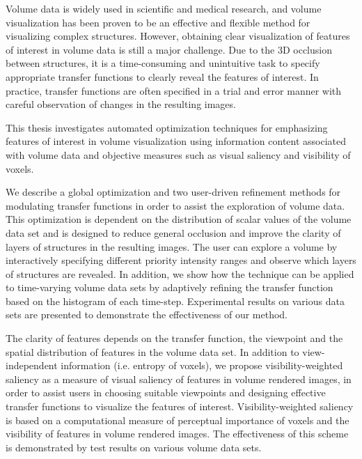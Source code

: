 \documentclass[a4paper, 12pt, oneside]{report}         %
\begin{document}
\begin{thesisabstract}
Volume data is widely used in scientific and medical research, and volume visualization has been proven to be an effective and flexible method for visualizing complex structures.
However, obtaining clear visualization of features of interest in volume data is still a major challenge.
Due to the 3D occlusion between structures, it is a time-consuming and unintuitive task to specify appropriate transfer functions to clearly reveal the features of interest.
In practice, transfer functions are often specified in a trial and error manner with careful observation of changes in the resulting images.

This thesis investigates automated optimization techniques for emphasizing features of interest in volume visualization using information content associated with volume data and objective measures such as visual saliency and visibility of voxels.

We describe a global optimization and two user-driven refinement methods for modulating transfer functions in order to assist the exploration of volume data.
This optimization is dependent on the distribution of scalar values of the volume data set and is designed to reduce general occlusion and improve the clarity of layers of structures in the resulting images.
The user can explore a volume by interactively specifying different priority intensity ranges and observe which layers of structures are revealed. In addition, we show how the technique can be applied to time-varying volume data sets by adaptively refining the transfer function based on the histogram of each time-step. 
Experimental results on various data sets are presented to demonstrate the effectiveness of our method.

The clarity of features depends on the transfer function, the viewpoint and the spatial distribution of features in the volume data set.
In addition to view-independent information (i.e. entropy of voxels),
we propose visibility-weighted saliency as a measure of visual saliency of features in volume rendered images, in order to assist users in choosing suitable viewpoints and designing effective transfer functions to visualize the features of interest.
Visibility-weighted saliency is based on a computational measure of perceptual importance of voxels and the visibility of features in volume rendered images.
The effectiveness of this scheme is demonstrated by test results on various volume data sets.


\end{thesisabstract}
\end{document}
